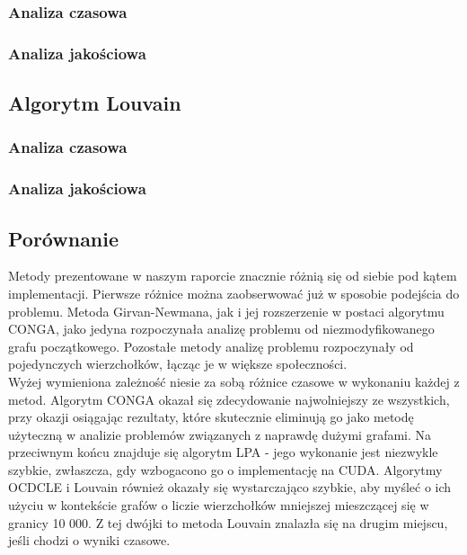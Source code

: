 \documentclass{article}
\begin{document}
\subsubsection{Analiza czasowa}
\subsubsection{Analiza jakościowa}

\subsection{Algorytm Louvain}
\subsubsection{Analiza czasowa}
\subsubsection{Analiza jakościowa}

\subsection{Porównanie}
Metody prezentowane w naszym raporcie znacznie różnią się od siebie pod kątem implementacji. Pierwsze różnice można zaobserwować już w sposobie podejścia do problemu. Metoda Girvan-Newmana, jak i jej rozszerzenie w postaci algorytmu CONGA, jako jedyna rozpoczynała analizę problemu od niezmodyfikowanego grafu początkowego. Pozostałe metody analizę problemu rozpoczynały od pojedynczych wierzchołków, łącząc je w większe społeczności. \\

Wyżej wymieniona zależność niesie za sobą różnice czasowe w wykonaniu każdej z metod. Algorytm CONGA okazał się zdecydowanie najwolniejszy ze wszystkich, przy okazji osiągając rezultaty, które skutecznie eliminują go jako metodę użyteczną w analizie problemów związanych z naprawdę dużymi grafami. Na przeciwnym końcu znajduje się algorytm LPA - jego wykonanie jest niezwykle szybkie, zwłaszcza, gdy wzbogacono go o implementację na CUDA. Algorytmy OCDCLE i Louvain również okazały się wystarczająco szybkie, aby myśleć o ich użyciu w kontekście grafów o liczie wierzchołków mniejszej mieszczącej się w granicy 10 000. Z tej dwójki to metoda Louvain znalazła się na drugim miejscu, jeśli chodzi o wyniki czasowe. \\
\end{document}
